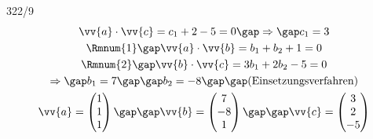 \begin{exercise}{322/9}
\begin{gather*}
    \vv{a} \cdot \vv{c} = c_1 + 2 - 5 = 0 \gap\Rightarrow\gap c_1 = 3 \\
    \text{\Rmnum{1}} \gap \vv{a} \cdot \vv{b} = b_1 + b_2 + 1 = 0 \\
    \text{\Rmnum{2}} \gap \vv{b} \cdot \vv{c} = 3b_1 + 2b_2 - 5 = 0 \\
    \Rightarrow\gap b_1 = 7 \gap\gap b_2 = -8 \gap\gap \text{(Einsetzungsverfahren)} \\
    \vv{a} = \begin{pmatrix}1 \\ 1 \\ 1\end{pmatrix} \gap\gap \vv{b} = \begin{pmatrix}7 \\ -8 \\ 1\end{pmatrix} \gap\gap \vv{c} = \begin{pmatrix}3 \\ 2 \\ -5\end{pmatrix}
  \end{gather*}
\end{exercise}

